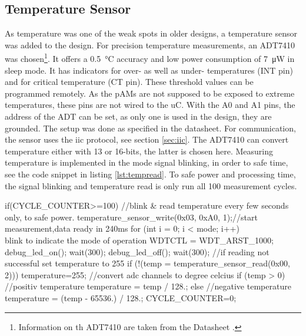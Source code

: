 \subsection*{Temperature Sensor}
As temperature was one of the weak spots in older designs, a temperature sensor was added to the design. For precision temperature measurements, an ADT7410 was chosen\footnote{Information on th ADT7410 are taken from the Datasheet \cite{ADT7410}.}. It offers a \SI{0.5}{\degreeCelsius} accuracy and low power consumption of \SI{7}{\micro\watt} in sleep mode. It has indicators for over- as well as under- temperatures (INT pin) and for critical temperature (CT pin). These threshold values can be programmed remotely. As the \acp{pAM} are not supposed to be exposed to extreme temperatures, these pins are not wired to the \ac{uC}. With the A0 and A1 pins, the address of the ADT can be set, as only one is used in the design, they are grounded. The setup was done as specified in the datasheet. For communication, the sensor uses the \ac{iic} protocol, see section \ref{sec:iic}. The ADT7410 can convert temperature either with 13 or 16-bits, the latter is chosen here. Measuring temperature is implemented in the mode signal blinking, in order to safe time, see the code snippet in listing \ref{lst:tempread}. 
To safe power and processing time, the signal blinking and temperature read is only run all 100 measurement cycles.
\begin{codecpp}[caption={The temperature reading and mode blinking loop\label{lst:tempread}.}]
if(CYCLE_COUNTER>=100){
	//blink \& read temperature every few seconds only, to safe power.
	temperature_sensor_write(0x03, 0xA0, 1);//start measurement,data ready in 240ms
	for (int i = 0; i < mode; i++) {
	\\blink to indicate the mode of operation
	WDTCTL = WDT_ARST_1000;
	debug_led_on();
	wait(300); 
	debug_led_off();
	wait(300);
	}
	//if reading not successful set temperature to 255
	if (!(temp = temperature_sensor_read(0x00, 2)))
		temperature=255;
	//convert \ac{adc} channels to degree celcius 
	if (temp > 0) {//positiv temperature
		temperature = temp / 128.; 
	} else {//negative temperature
		temperature = (temp - 65536.) / 128.;
	}
	CYCLE_COUNTER=0;
}
\end{codecpp}

